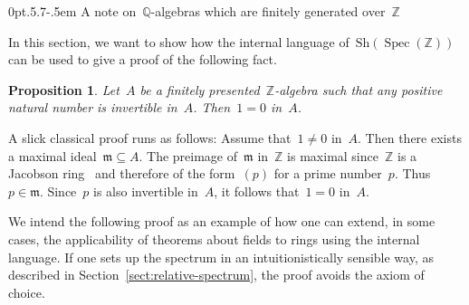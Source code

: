 \documentclass[10pt,reqno,a4paper]{amsbook}
\makeatletter
\theoremstyle{definition}
\theoremstyle{plain}
\newtheorem{prop}[defn]{Proposition}
\theoremstyle{remark}
\newcommand{\ZZ}{\mathbb{Z}}
\newcommand{\QQ}{\mathbb{Q}}
\newcommand{\mmm}{\mathfrak{m}}
\newcommand{\Sh}{\mathrm{Sh}}
\DeclareMathOperator{\Spec}{Spec}
\newcommand{\?}{\,{:}\,}
\renewcommand{\_}{\mathpunct{.}\,}
\newcommand{\stacksproject}[1]{\cite[{\href{https://stacks.math.columbia.edu/tag/#1}{Tag~#1}}]{stacks-project}}
\def\subsection{\@startsection{subsection}{2}%
  {0pt}{.5\linespacing\@plus.7\linespacing}{-.5em}%
  {\normalfont\bfseries}}
\makeatother
\begin{document}
\subsection{\texorpdfstring{A note on~$\QQ$-algebras which are finitely
generated over~$\ZZ$}{A note on~ℚ-algebras which are finitely generated
over~ℤ}}

In this section, we want to show how the internal language of~$\Sh(\Spec(\ZZ))$
can be used to give a proof of the following fact.

\begin{prop}\label{prop:fingen-algebra-q}
Let~$A$ be a finitely presented~$\ZZ$-algebra such that any positive natural
number is invertible in~$A$. Then~$1 = 0$ in~$A$.
\end{prop}

A slick classical proof runs as follows: Assume that~$1 \neq 0$ in~$A$. Then
there exists a maximal ideal~$\mmm \subseteq A$. The preimage of~$\mmm$
in~$\ZZ$ is maximal since~$\ZZ$ is a Jacobson ring~\stacksproject{00GB} and
therefore of the form~$(p)$ for a prime number~$p$. Thus~$p \in \mmm$.
Since~$p$ is also invertible in~$A$, it follows that~$1 = 0$ in~$A$.

We intend the following proof as an example of how one can extend, in some
cases, the applicability of theorems about fields to rings using the internal
language. If one sets up the spectrum in an intuitionistically sensible way, as
described in Section~\ref{sect:relative-spectrum}, the proof avoids the axiom
of choice.
\end{document}

